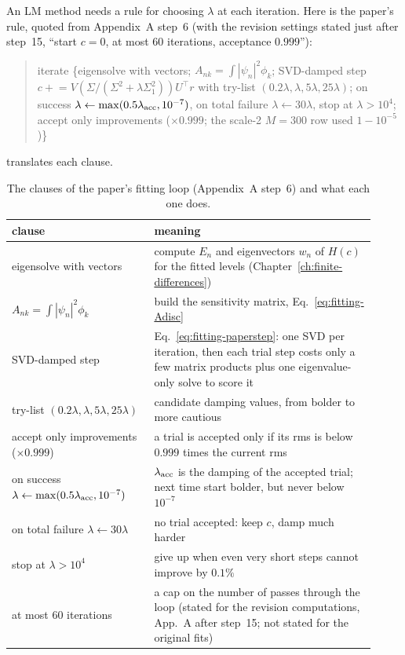 An LM method needs a rule for choosing $\lambda$ at each iteration. Here is the paper's rule, quoted from Appendix~A step~6 (with the revision settings stated just after step~15, ``start $c=0$, at most 60 iterations, acceptance $0.999$''):

\begin{quote}
iterate \{eigensolve with vectors; $A_{nk}=\int|\psi_n|^2\phi_k$; SVD-damped step $c\mathrel{+}=V(\Sigma/(\Sigma^2+\lambda\Sigma_1^2))U^\top r$ with try-list $(0.2\lambda,\lambda,5\lambda,25\lambda)$; on success $\lambda\leftarrow\max(0.5\lambda_{\rm acc},10^{-7})$, on total failure $\lambda\leftarrow30\lambda$, stop at $\lambda>10^4$; accept only improvements ($\times0.999$; the scale-2 $M{=}300$ row used $1-10^{-5}$)\}
\end{quote}

 translates each clause.

\begin{table}[htbp]\centering
\caption{The clauses of the paper's fitting loop (Appendix~A step~6) and what each one does.}
\label{tab:fitting-schedule}
\small
\begin{tabular}{p{0.36\linewidth}p{0.56\linewidth}}
\toprule
clause & meaning\\
\midrule
eigensolve with vectors & compute $E_n$ and eigenvectors $w_n$ of $H(c)$ for the fitted levels (Chapter~\ref{ch:finite-differences})\\
$A_{nk}=\int|\psi_n|^2\phi_k$ & build the sensitivity matrix, Eq.~\eqref{eq:fitting-Adisc}\\
SVD-damped step & Eq.~\eqref{eq:fitting-paperstep}: one SVD per iteration, then each trial step costs only a few matrix products plus one eigenvalue-only solve to score it\\
try-list $(0.2\lambda,\lambda,5\lambda,25\lambda)$ & candidate damping values, from bolder to more cautious\\
accept only improvements ($\times0.999$) & a trial is accepted only if its rms is below $0.999$ times the current rms\\
on success $\lambda\leftarrow\max(0.5\lambda_{\rm acc},10^{-7})$ & $\lambda_{\rm acc}$ is the damping of the accepted trial; next time start bolder, but never below $10^{-7}$\\
on total failure $\lambda\leftarrow30\lambda$ & no trial accepted: keep $c$, damp much harder\\
stop at $\lambda>10^4$ & give up when even very short steps cannot improve by $0.1\%$\\
at most 60 iterations & a cap on the number of passes through the loop (stated for the revision computations, App.~A after step~15; not stated for the original fits)\\
\bottomrule
\end{tabular}
\end{table}

